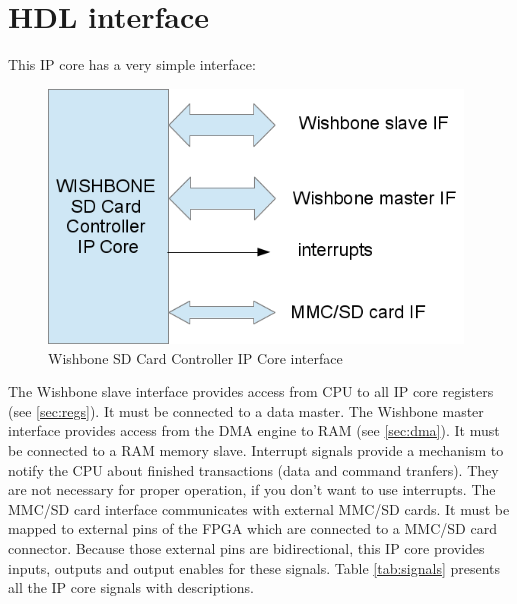 \section{HDL interface}
\label{sec:hdl_if}

    This IP core has a very simple interface:
    \begin{figure}[H]
        \centering
        \includegraphics[width=11cm]{../bin/ip_core_if.png}
        \caption{Wishbone SD Card Controller IP Core interface}
        \label{img:ip_core_if}
    \end{figure}
    The Wishbone slave interface provides access from CPU to all IP core registers (see \ref{sec:regs}). It must
    be connected to a data master. The Wishbone master interface provides access from the DMA engine to RAM (see \ref{sec:dma}). 
    It must be connected to a RAM memory slave. Interrupt signals provide a mechanism to notify the CPU about finished transactions (data and command tranfers).
    They are not necessary for proper operation, if you don't want to use interrupts. The MMC/SD card interface communicates with external MMC/SD cards.
    It must be mapped to external pins of the FPGA which are connected to a MMC/SD card connector. Because those external pins are bidirectional, this IP core
    provides inputs, outputs and output enables for these signals.
    Table \ref{tab:signals} presents all the IP core signals with descriptions.
    
